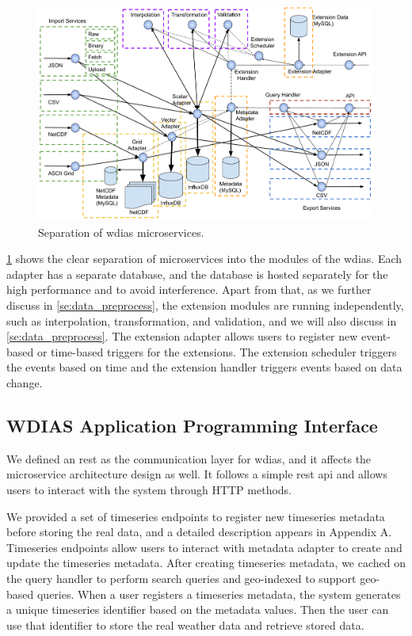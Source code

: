 \begin{figure}[htp]
    \centering
    \includegraphics[width=1\textwidth]{method/microservice/separation_microservices-v4.pdf}
    \caption{Separation of \acrshort{wdias} microservices.}
    \label{fi:wdias_micro_separation}
\end{figure}

\cref{fi:wdias_micro_separation} shows the clear separation of microservices into the modules of the \acrshort{wdias}. Each adapter has a separate database, and the database is hosted separately for the high performance and to avoid interference.
Apart from that, as we further discuss in \cref{se:data_preprocess}, the extension modules are running independently, such as interpolation, transformation, and validation, and we will also discuss in \cref{se:data_preprocess}. The extension adapter allows users to register new event-based or time-based triggers for the extensions. The extension scheduler triggers the events based on time and the extension handler triggers events based on data change.


\subsection{WDIAS Application Programming Interface}
\label{sebse:wdias_api}

We defined an \acrshort{rest} as the communication layer for \acrshort{wdias}, and it affects the microservice architecture design as well. It follows a simple \acrshort{rest} \acrshort{api} and allows users to interact with the system through HTTP methods.

We provided a set of timeseries endpoints to register new timeseries metadata before storing the real data, and a detailed description appears in Appendix A. Timeseries endpoints allow users to interact with metadata adapter to create and update the timeseries metadata. After creating timeseries metadata, we cached on the query handler to perform search queries and geo-indexed to support geo-based queries. When a user registers a timeseries metadata, the system generates a unique timeseries identifier based on the metadata values. Then the user can use that identifier to store the real weather data and retrieve stored data.

